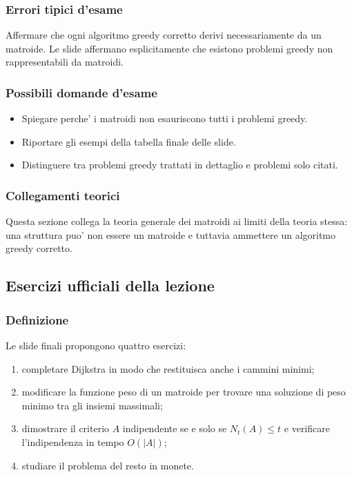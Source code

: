 \subsubsection{Errori tipici d'esame}
\begin{hardnote}
Affermare che ogni algoritmo greedy corretto derivi necessariamente da un matroide. Le slide affermano esplicitamente che esistono problemi greedy non rappresentabili da matroidi.
\end{hardnote}

\subsubsection{Possibili domande d'esame}
\begin{itemize}
	\item Spiegare perche' i matroidi non esauriscono tutti i problemi greedy.
	\item Riportare gli esempi della tabella finale delle slide.
	\item Distinguere tra problemi greedy trattati in dettaglio e problemi solo citati.
\end{itemize}

\subsubsection{Collegamenti teorici}
Questa sezione collega la teoria generale dei matroidi ai limiti della teoria stessa: una struttura puo' non essere un matroide e tuttavia ammettere un algoritmo greedy corretto.

\subsection{Esercizi ufficiali della lezione}

\subsubsection{Definizione}
Le slide finali propongono quattro esercizi:
\begin{enumerate}
	\item completare Dijkstra in modo che restituisca anche i cammini minimi;
	\item modificare la funzione peso di un matroide per trovare una soluzione di peso minimo tra gli insiemi massimali;
	\item dimostrare il criterio $A$ indipendente se e solo se $N_t(A)\le t$ e verificare l'indipendenza in tempo $O(|A|)$;
	\item studiare il problema del resto in monete.
\end{enumerate}

